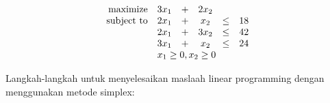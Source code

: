 \begin{equation*}
	\begin{array}{r c c c c l}
		\text{maximize}   & 3x_1 & + & 2x_2 \\
		\text{subject to} & 2x_1 & + & x_2  & \leq & 18 \\
        					& 2x_1 & + & 3x_2 & \leq & 42 \\
                           	& 3x_1 & + & x_2  & \leq & 24 \\
                           	& \multicolumn{5}{l}{x_1\geq0,x_2\geq0} \\
	\end{array}
\end{equation*}
        
Langkah-langkah untuk menyelesaikan maslaah linear programming dengan menggunakan metode simplex:

